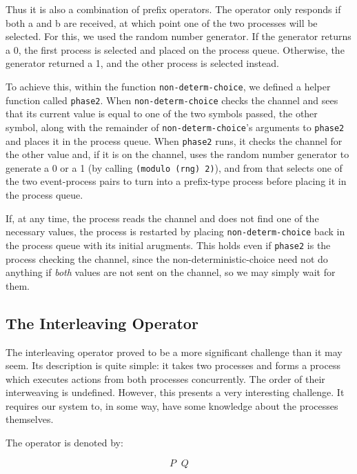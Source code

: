 \documentclass{article}
\DeclareMathOperator\triplebar{|||} %
\begin{document}
Thus it is also a combination of prefix operators. The operator only responds if both a and b are received, at which
point one of the two processes will be selected. For this, we used
the random number generator. If the generator returns a 0, the first
process is selected and placed on the process queue. Otherwise, the
generator returned a 1, and the other process is selected instead.

To achieve this, within the function \texttt{non-determ-choice}, we
defined a helper function called \texttt{phase2}. When
\texttt{non-determ-choice} checks the channel and sees that its
current value is equal to one of the two symbols passed, the other
symbol, along with the remainder of \texttt{non-determ-choice}'s 
arguments to \texttt{phase2} and places it in the process queue.
When \texttt{phase2} runs, it checks the channel for the other value
and, if it is on the channel, uses the random number generator
to generate a 0 or a 1 (by calling \texttt{(modulo (rng) 2)}), and
from that selects one of the two event-process pairs to turn into
a prefix-type process before placing it in the process queue.

If, at any time, the process reads the channel and does not find one
of the necessary values, the process is restarted by placing 
\texttt{non-determ-choice} back in the process queue with its 
initial arugments. This holds even if \texttt{phase2} is the process
checking the channel, since the non-deterministic-choice need not
do anything if \textit{both} values are not sent on the channel, so 
we may simply wait for them.

\subsection*{The Interleaving Operator}
The interleaving operator proved to be a more significant challenge than
it may seem. Its description is quite simple: it takes two processes and
forms a process which executes actions from both processes concurrently.
The order of their interweaving is undefined. However, this presents a very
interesting challenge. It requires our system to, in some way, have some
knowledge about the processes themselves.

The operator is denoted by:

\[ P \triplebar Q \]
\end{document}
